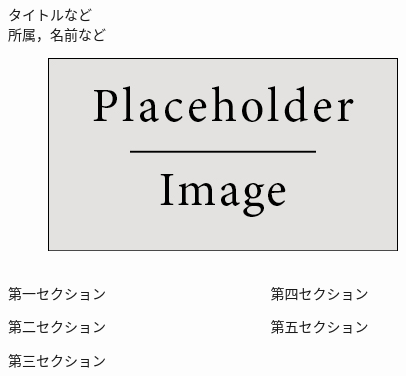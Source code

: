 \documentclass[final, dvipdfmx, 15pt]{beamer}
\begin{document}
\begin{frame}[t]{}
  \begin{minipage}[]{0.88\columnwidth}
    \Huge タイトルなど  \\[10mm]
    \Large 所属，名前など \\
  \end{minipage}
  \begin{minipage}[]{0.11\columnwidth}
    \begin{figure}\centering
      \includegraphics[width=\columnwidth]{placeholder.jpg}
    \end{figure}
  \end{minipage}
  \begin{columns}[T]
    \begin{column}{.49\linewidth}
      \begin{block}{第一セクション}
        
      \end{block}
      \begin{block}{第二セクション}
        \vspace{0.3\textheight}
      \end{block}
      \begin{block}{第三セクション}
        \vspace{0.3\textheight}
      \end{block}
      \end{column}
      \begin{column}{.49\linewidth}
      \begin{block}{第四セクション}
        \vspace{0.45\textheight}
      \end{block}
      \begin{block}{第五セクション}
        \vspace{0.45\textheight}
      \end{block}
    \end{column}
  \end{columns}
  \end{frame}
\end{document}
